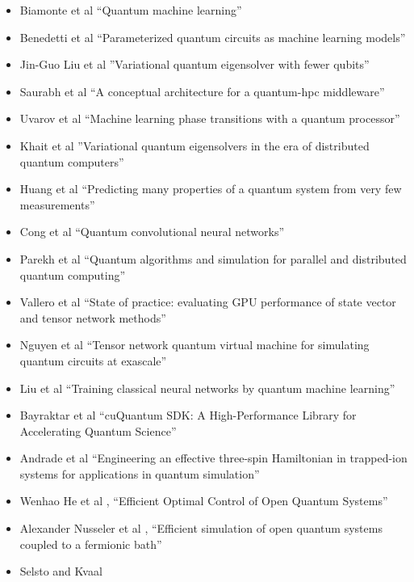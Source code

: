 \documentclass[]{article}
\begin{document}
\begin{itemize}
\item Biamonte et al\cite{biamonte2017quantum}
``Quantum machine learning''
\item Benedetti et al\cite{Benedetti_2019}
``Parameterized quantum circuits as machine learning models''
\item Jin-Guo Liu et al\cite{PhysRevResearch.1.023025}
''Variational quantum eigensolver with fewer qubits''
\item Saurabh et al\cite{saurabh2023conceptual}
``A conceptual architecture for a quantum-hpc middleware''
\item Uvarov et al\cite{uvarov2020machine}
``Machine learning phase transitions with a quantum processor''
\item Khait et al\cite{khait2023variational}
''Variational quantum eigensolvers in the era of distributed quantum computers''
\item Huang et al\cite{huang2020predicting}
``Predicting many properties of a quantum system from very few measurements''
\item Cong et al\cite{cong2019quantum}
``Quantum convolutional neural networks''
\item Parekh et al\cite{parekh2021quantum}
``Quantum algorithms and simulation for parallel and distributed quantum computing''
\item Vallero et al\cite{vallero2024state}
``State of practice: evaluating GPU performance of state vector and tensor network methods''
\item Nguyen et al\cite{nguyen2022tensor}
``Tensor network quantum virtual machine for simulating quantum circuits at exascale''
\item Liu et al\cite{liu2024training}
``Training classical neural networks by quantum machine learning''
\item Bayraktar et al\cite{10313722}
``cuQuantum SDK: A High-Performance Library for Accelerating Quantum Science''
\item Andrade et al\cite{Andrade_2022}
``Engineering an effective three-spin Hamiltonian in trapped-ion systems for applications in quantum simulation''
\item Wenhao He et al
 \cite{he2024efficientoptimalcontrolopen},
 ``Efficient Optimal Control of Open Quantum Systems''
\item Alexander Nusseler et al
\cite{PhysRevB.101.155134},
``Efficient simulation of open quantum systems coupled to a fermionic bath''
\item Selsto and Kvaal

\end{itemize}
\end{document}
